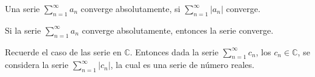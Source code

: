 \begin{definicion}
	Una serie $\sum_{n=1}^{\infty} a_n$ converge absolutamente, si $\sum_{n=1}^\infty |a_n|$ converge. 
\end{definicion}


\begin{teorema}
	Si la serie $\sum_{n=1}^{\infty}  a_n$ converge absolutamente, entonces la serie converge. 
\end{teorema}

\begin{nota}
	Recuerde el caso de las serie en $\mathbb{C}$. Entonces dada la serie $\sum_{n=1}^{\infty} c_n$, los $c_n\in\mathbb{C}$, se considera la serie $\sum_{n=1}^{\infty}|c_n|$, la cual es una serie de número reales. 
\end{nota}

